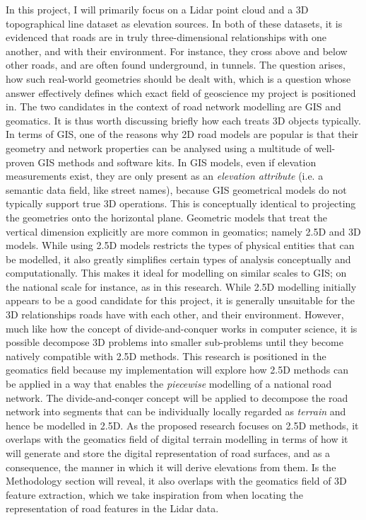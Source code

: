 In this project, I will primarily focus on a Lidar point cloud and a 3D topographical line dataset as elevation sources. In both of these datasets, it is evidenced that roads are in truly three-dimensional relationships with one another, and with their environment. For instance, they cross above and below other roads, and are often found underground, in tunnels. The question arises, how such real-world geometries should be dealt with, which is a question whose answer effectively defines which exact field of geoscience my project is positioned in. The two candidates in the context of road network modelling are GIS and geomatics. It is thus worth discussing briefly how each treats 3D objects typically. In terms of GIS, one of the reasons why 2D road models are popular is that their geometry and network properties can be analysed using a multitude of well-proven GIS methods and software kits. In GIS models, even if elevation measurements exist, they are only present as an \textit{elevation attribute} (i.e. a semantic data field, like street names), because GIS geometrical models do not typically support true 3D operations. This is conceptually identical to projecting the geometries onto the horizontal plane. Geometric models that treat the vertical dimension explicitly are more common in geomatics; namely 2.5D and 3D models. While using 2.5D models restricts the types of physical entities that can be modelled, it also greatly simplifies certain types of analysis conceptually and computationally. This makes it ideal for modelling on similar scales to GIS; on the national scale for instance, as in this research. While 2.5D modelling initially appears to be a good candidate for this project, it is generally unsuitable for the 3D relationships roads have with each other, and their environment. However, much like how the concept of divide-and-conquer works in computer science, it is possible decompose 3D problems into smaller sub-problems until they become natively compatible with 2.5D methods. This research is positioned in the geomatics field because my implementation will explore how 2.5D methods can be applied in a way that enables the \textit{piecewise} modelling of a national road network. The divide-and-conqer concept will be applied to decompose the road network into segments that can be individually locally regarded as \textit{terrain} and hence be modelled in 2.5D. As the proposed research focuses on 2.5D methods, it overlaps with the geomatics field of digital terrain modelling in terms of how it will generate and store the digital representation of road surfaces, and as a consequence, the manner in which it will derive elevations from them. Is the Methodology section will reveal, it also overlaps with the geomatics field of 3D feature extraction, which we take inspiration from when locating the representation of road features in the Lidar data.





